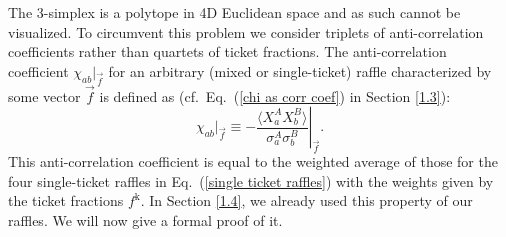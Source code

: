 The 3-simplex is a polytope in 4D Euclidean space and as such cannot be visualized. To circumvent this problem we consider triplets of anti-correlation coefficients rather than quartets of ticket fractions. The anti-correlation coefficient $\chi_{ab}|_{\vec{f}}$ for an arbitrary (mixed or single-ticket) raffle characterized by some vector $\vec{f}$ is defined as (cf.\ Eq.\ (\ref{chi as corr coef}) in Section \ref{1.3}):
\begin{equation}
 \chi_{ab} |_{\vec{f}} \equiv \left. -\frac{\langle X^A_a X^B_b \rangle}{\sigma^A_a \sigma^B_b} \right|_{\vec{f}}.
 \label{chi for f spin 1/2} 
\end{equation}
This anti-correlation coefficient is equal to the weighted average of those for the four single-ticket raffles in Eq.\ (\ref{single ticket raffles}) with the weights given by the ticket fractions $f^{\mathrm{k}}$. In Section \ref{1.4}, we already used this property of our raffles. We will now give a formal proof of it. 

